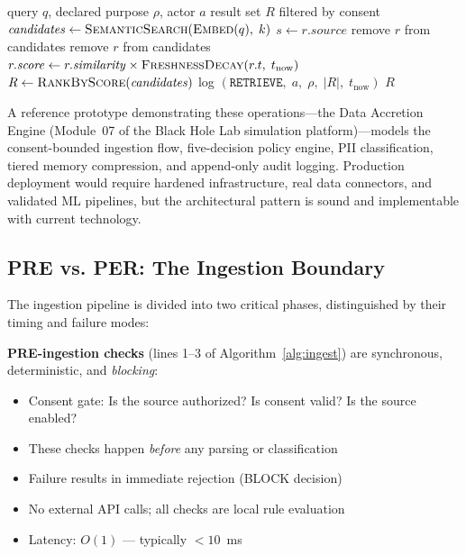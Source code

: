 \documentclass[11pt,twocolumn]{article}
\begin{document}
\begin{algorithm}[H]
\caption{\textsc{Retrieve} --- Purpose-Constrained Query}
\label{alg:retrieve}
\begin{algorithmic}[1]
\REQUIRE query $q$, declared purpose $\rho$, actor $a$
\ENSURE result set $R$ filtered by consent
\STATE $\mathit{candidates} \leftarrow \textsc{SemanticSearch}(\textsc{Embed}(q),\; k)$
  \STATE $s \leftarrow r.\mathit{source}$
    \STATE remove $r$ from candidates
    \STATE remove $r$ from candidates
  \ELSE
    \STATE $r.\mathit{score} \leftarrow r.\mathit{similarity} \times \textsc{FreshnessDecay}(r.t,\; t_{\text{now}})$
  \ENDIF
\ENDFOR
\STATE $R \leftarrow \textsc{RankByScore}(\mathit{candidates})$
\STATE log $(\texttt{RETRIEVE},\; a,\; \rho,\; |R|,\; t_{\text{now}})$
\RETURN $R$
\end{algorithmic}
\end{algorithm}

A reference prototype demonstrating these operations---the Data Accretion Engine (Module~07 of the Black Hole Lab simulation platform)---models the consent-bounded ingestion flow, five-decision policy engine, PII classification, tiered memory compression, and append-only audit logging. Production deployment would require hardened infrastructure, real data connectors, and validated ML pipelines, but the architectural pattern is sound and implementable with current technology.

\subsection{PRE vs. PER: The Ingestion Boundary}

The ingestion pipeline is divided into two critical phases, distinguished by their timing and failure modes:

\textbf{PRE-ingestion checks} (lines 1--3 of Algorithm~\ref{alg:ingest}) are synchronous, deterministic, and \emph{blocking}:

\begin{itemize}[nosep,leftmargin=1.2em]
  \item Consent gate: Is the source authorized? Is consent valid? Is the source enabled?
  \item These checks happen \emph{before} any parsing or classification
  \item Failure results in immediate rejection (BLOCK decision)
  \item No external API calls; all checks are local rule evaluation
  \item Latency: $O(1)$ — typically $< 10$~ms
\end{itemize}
\end{document}
